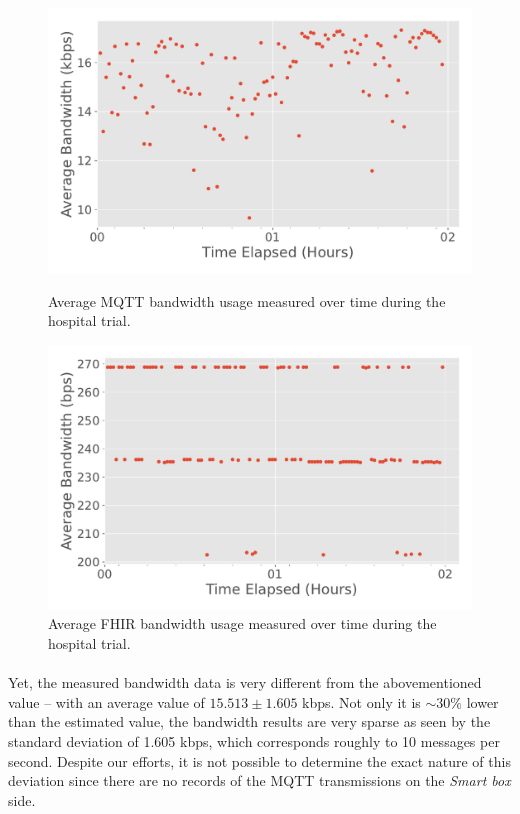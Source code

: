 \begin{figure}[H]
    \begin{minipage}{0.49\linewidth}
        \centering
        \includegraphics[width=\linewidth]{images/pilot_mqtt_bandwidth.pdf}
        \caption{Average \acs{MQTT} bandwidth usage measured over time during the hospital trial. }
        \label{fig:pilot-mqtt-bandwidth}
    \end{minipage}
    \hspace{0.02\linewidth}
    \begin{minipage}{0.49\linewidth}
        \centering
        \includegraphics[width=\linewidth]{images/pilot_fhir_bandwidth.pdf}
        \caption{Average \acs{FHIR} bandwidth usage measured over time during the hospital trial.}
        \label{fig:pilot-fhir-bandwidth}
    \end{minipage}
\end{figure}


\paragraph{} Yet, the measured bandwidth data is very different from the abovementioned value -- with an average value of $15.513 \pm 1.605$ kbps. Not only it is ${\sim}  30\%$ lower than the estimated value, the bandwidth results are very sparse as seen by the standard deviation of 1.605 kbps, which corresponds roughly to 10 messages per second. Despite our efforts, it is not possible to determine the exact nature of this deviation since there are no records of the \acs{MQTT} transmissions on the \textit{Smart box} side. 

